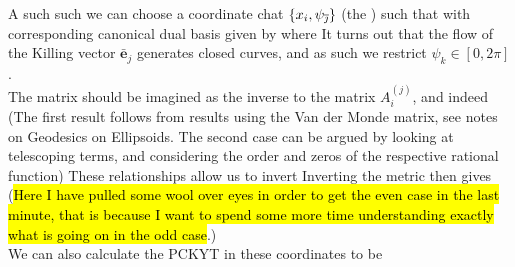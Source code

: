 \documentclass{article}
\begin{document}
A such such we can choose a coordinate chat $\left\{ x_i, \psi_{\overline{\jmath}} \right\}$ (the ) such that 
with corresponding canonical dual basis given by 
where 
It turns out that the flow of the Killing vector $\bar{\bm{e}}_j$ generates closed curves, and as such we restrict $\psi_k \in [0,2\pi]$. \\
The matrix 
should be imagined as the inverse to the matrix $A_i^{(j)}$, and indeed 
(The first result follows from results using the Van der Monde matrix, see notes on Geodesics on Ellipsoids. The second case can be argued by looking at telescoping terms, and considering the order and zeros of the respective rational function)
These relationships allow us to invert
Inverting the metric then gives 
(\hl{Here I have pulled some wool over eyes in order to get the even case in the last minute, that is because I want to spend some more time understanding exactly what is going on in the odd case}.) \\
We can also calculate the PCKYT in these coordinates to be 
\end{document}
